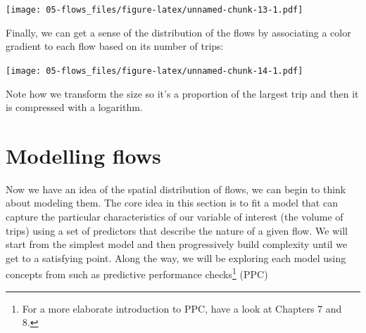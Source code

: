 \documentclass[
]{book}
\newenvironment{Shaded}{\begin{snugshade}}{\end{snugshade}}
\newcommand{\DataTypeTok}[1]{\textcolor[rgb]{0.13,0.29,0.53}{#1}}
\newcommand{\FloatTok}[1]{\textcolor[rgb]{0.00,0.00,0.81}{#1}}
\newcommand{\KeywordTok}[1]{\textcolor[rgb]{0.13,0.29,0.53}{\textbf{#1}}}
\newcommand{\NormalTok}[1]{#1}
\newcommand{\OperatorTok}[1]{\textcolor[rgb]{0.81,0.36,0.00}{\textbf{#1}}}
\newcommand{\StringTok}[1]{\textcolor[rgb]{0.31,0.60,0.02}{#1}}
\begin{document}
\texttt{[image: 05-flows\_files/figure-latex/unnamed-chunk-13-1.pdf]}

Finally, we can get a sense of the distribution of the flows by associating a color gradient to each flow based on its number of trips:

\begin{Shaded}
\end{Shaded}

\texttt{[image: 05-flows\_files/figure-latex/unnamed-chunk-14-1.pdf]}

Note how we transform the size so it's a proportion of the largest trip and then it is compressed with a logarithm.

\hypertarget{modelling-flows}{%
\section{Modelling flows}\label{modelling-flows}}

Now we have an idea of the spatial distribution of flows, we can begin to think about modeling them. The core idea in this section is to fit a model that can capture the particular characteristics of our variable of interest (the volume of trips) using a set of predictors that describe the nature of a given flow. We will start from the simplest model and then progressively build complexity until we get to a satisfying point. Along the way, we will be exploring each model using concepts from \citet{gelman2006data} such as predictive performance checks\footnote{For a more elaborate introduction to PPC, have a look at Chapters 7 and 8.} (PPC)
\end{document}

